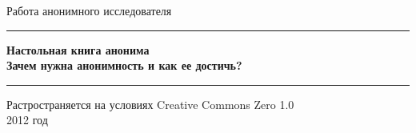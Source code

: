 \begin{titlepage}

\begin{center}
Работа анонимного исследователя
\vspace{10em}

\rule{\linewidth}{0.5mm}
\LARGE \textbf{Настольная книга анонима}\\
\Large \textbf{Зачем нужна анонимность и как ее достичь?}
\rule{\linewidth}{0.5mm}
\vfill
\normalsize Растространяется на условиях Creative Commons Zero 1.0\\
2012 год
\end{center}

\end{titlepage}